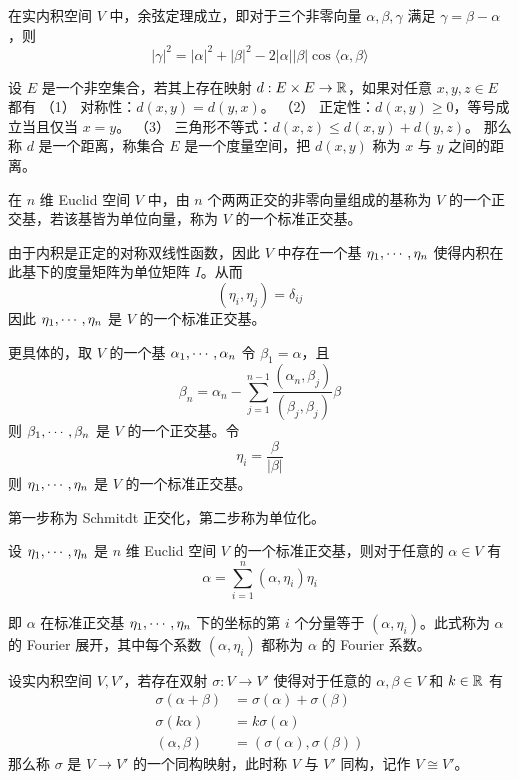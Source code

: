 \begin{proposition}
    在实内积空间 $V$ 中，余弦定理成立，即对于三个非零向量 $\alpha,\beta,\gamma$ 满足 $\gamma = \beta - \alpha$，则
    \[ |\gamma|^2  = |\alpha|^2 + |\beta|^2 - 2 |\alpha| |\beta| \cos\langle\alpha,\beta\rangle \]
\end{proposition}

\begin{definition}
    设 $E$ 是一个非空集合，若其上存在映射 $d : E \times E \to \mathbb{R}$，如果对任意 $x,y,z\in E$ 都有
    （1） 对称性：$d(x,y) = d(y,x)$。
    （2） 正定性：$d(x,y) \geqslant $0，等号成立当且仅当 $x = y$。
    （3） 三角形不等式：$d(x,z) \leqslant d(x,y) + d(y,z)$。
    那么称 $d$ 是一个距离，称集合 $E$ 是一个度量空间，把 $d(x,y)$ 称为 $x$ 与 $y$ 之间的距离。
\end{definition}

\begin{definition}
    在 $n$ 维 Euclid 空间 $V$ 中，由 $n$ 个两两正交的非零向量组成的基称为 $V$ 的一个正交基，若该基皆为单位向量，称为 $V$ 的一个标准正交基。
\end{definition}

由于内积是正定的对称双线性函数，因此 $V$ 中存在一个基 $\eta_1,\cdots,\eta_n$ 使得内积在此基下的度量矩阵为单位矩阵 $I$。从而
\[ (\eta_i,\eta_j) = \delta_{ij} \]
因此 $\eta_1,\cdots,\eta_n$ 是 $V$ 的一个标准正交基。

更具体的，取 $V$ 的一个基 $\alpha_1,\cdots,\alpha_n$ 令 $\beta_1 = \alpha$，且
\[ \beta_n = \alpha_n - \sum_{j=1}^{n-1} \frac{(\alpha_n,\beta_j)}{(\beta_j,\beta_j)} \beta \]
则 $\beta_1,\cdots,\beta_n$ 是 $V$ 的一个正交基。令
\[ \eta_i = \frac{\beta}{|\beta|} \]
则 $\eta_1,\cdots,\eta_n$ 是 $V$ 的一个标准正交基。

第一步称为 Schmitdt 正交化，第二步称为单位化。

\begin{theorem}
    设 $\eta_1,\cdots,\eta_n$ 是 $n$ 维 Euclid 空间 $V$ 的一个标准正交基，则对于任意的 $\alpha \in V$ 有
    \[ \alpha = \sum_{i=1}^n (\alpha,\eta_i)\eta_i \]
\end{theorem}

即 $\alpha$ 在标准正交基 $\eta_1,\cdots,\eta_n$ 下的坐标的第 $i$ 个分量等于 $(\alpha,\eta_i)$。此式称为 $\alpha$ 的 Fourier 展开，其中每个系数 $(\alpha,\eta_i)$ 都称为 $\alpha$ 的 Fourier 系数。

\begin{definition}
    设实内积空间 $V,V'$，若存在双射 $\sigma : V \to V'$ 使得对于任意的 $\alpha,\beta \in V$ 和 $k \in \mathbb{R}$ 有
    \begin{equation*}
        \begin{aligned}
            \sigma(\alpha + \beta) & = \sigma(\alpha) + \sigma(\beta)  \\
            \sigma(k\alpha)        & = k\sigma(\alpha)                 \\
            (\alpha,\beta)         & = (\sigma(\alpha),\sigma(\beta))
        \end{aligned}
    \end{equation*}
    那么称 $\sigma$ 是 $V \to V'$ 的一个同构映射，此时称 $V$ 与 $V'$ 同构，记作 $V \cong V'$。
\end{definition}

